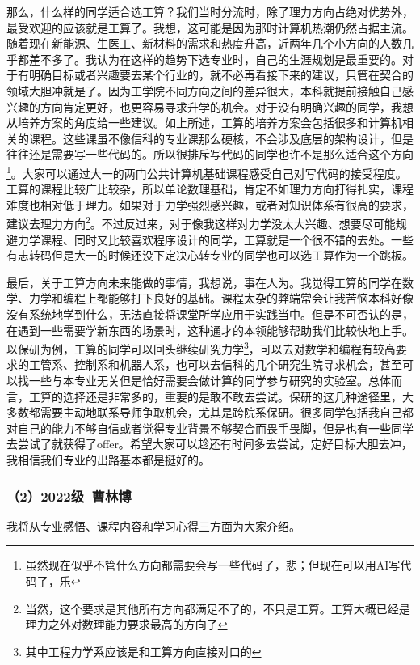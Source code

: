 那么，什么样的同学适合选工算？我们当时分流时，除了理力方向占绝对优势外，最受欢迎的应该就是工算了。我想，这可能是因为那时计算机热潮仍然占据主流。随着现在新能源、生医工、新材料的需求和热度升高，近两年几个小方向的人数几乎都差不多了。我认为在这样的趋势下选专业时，自己的生涯规划是最重要的。对于有明确目标或者兴趣要去某个行业的，就不必再看接下来的建议，只管在契合的领域大胆冲就是了。因为工学院不同方向之间的差异很大，本科就提前接触自己感兴趣的方向肯定更好，也更容易寻求升学的机会。对于没有明确兴趣的同学，我想从培养方案的角度给一些建议。如上所述，工算的培养方案会包括很多和计算机相关的课程。这些课虽不像信科的专业课那么硬核，不会涉及底层的架构设计，但是往往还是需要写一些代码的。所以很排斥写代码的同学也许不是那么适合这个方向\footnote{虽然现在似乎不管什么方向都需要会写一些代码了，悲；但现在可以用AI写代码了，乐}。大家可以通过大一的两门公共计算机基础课程感受自己对写代码的接受程度。工算的课程比较广比较杂，所以单论数理基础，肯定不如理力方向打得扎实，课程难度也相对低于理力。如果对于力学强烈感兴趣，或者对知识体系有很高的要求，建议去理力方向\footnote{当然，这个要求是其他所有方向都满足不了的，不只是工算。工算大概已经是理力之外对数理能力要求最高的方向了}。不过反过来，对于像我这样对力学没太大兴趣、想要尽可能规避力学课程、同时又比较喜欢程序设计的同学，工算就是一个很不错的去处。一些有志转码但是大一的时候还没下定决心转专业的同学也可以选工算作为一个跳板。

\vspace{10pt}

最后，关于工算方向未来能做的事情，我想说，事在人为。我觉得工算的同学在数学、力学和编程上都能够打下良好的基础。课程太杂的弊端常会让我苦恼本科好像没有系统地学到什么，无法直接将课堂所学应用于实践当中。但是不可否认的是，在遇到一些需要学新东西的场景时，这种通才的本领能够帮助我们比较快地上手。以保研为例，工算的同学可以回头继续研究力学\footnote{其中工程力学系应该是和工算方向直接对口的}，可以去对数学和编程有较高要求的工管系、控制系和机器人系，也可以去信科的几个研究生院寻求机会，甚至可以找一些与本专业无关但是恰好需要会做计算的同学参与研究的实验室。总体而言，工算的选择还是非常多的，重要的是敢不敢去尝试。保研的这几种途径里，大多数都需要主动地联系导师争取机会，尤其是跨院系保研。很多同学包括我自己都对自己的能力不够自信或者觉得专业背景不够契合而畏手畏脚，但是也有一些同学去尝试了就获得了offer。希望大家可以趁还有时间多去尝试，定好目标大胆去冲，我相信我们专业的出路基本都是挺好的。
\subsubsection{（2）2022级\ 曹林博}

我将从专业感悟、课程内容和学习心得三方面为大家介绍。

